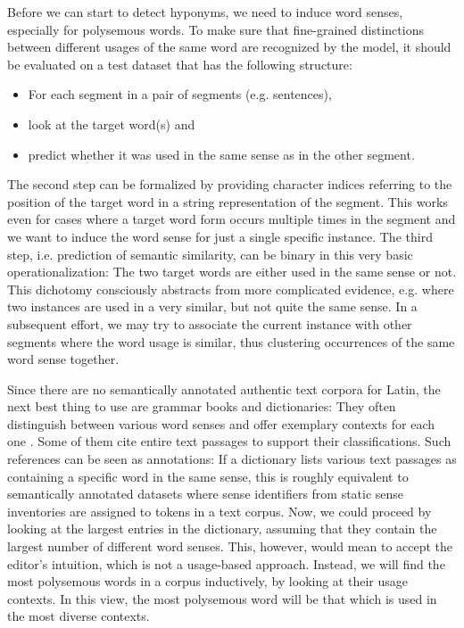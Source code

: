 \documentclass[runningheads]{llncs}
\begin{document}
Before we can start to detect hyponyms, we need to induce word senses, especially for polysemous words. To make sure that fine-grained distinctions between different usages of the same word are recognized by the model, it should be evaluated on a test dataset that has the following structure:
\begin{itemize}
	\item For each segment in a pair of segments (e.g. sentences),
	\item look at the target word(s) and
	\item predict whether it was used in the same sense as in the other segment.
\end{itemize}
The second step can be formalized by providing character indices referring to the position of the target word in a string representation of the segment. This works even for cases where a target word form occurs multiple times in the segment and we want to induce the word sense for just a single specific instance. The third step, i.e. prediction of semantic similarity, can be binary in this very basic operationalization: The two target words are either used in the same sense or not. This dichotomy consciously abstracts from more complicated evidence, e.g. where two instances are used in a very similar, but not quite the same sense. In a subsequent effort, we may try to associate the current instance with other segments where the word usage is similar, thus clustering occurrences of the same word sense together. 

Since there are no semantically annotated authentic text corpora for Latin, the next best thing to use are grammar books and dictionaries: They often distinguish between various word senses and offer exemplary contexts for each one \parencites{georgesAusfuhrlichesLateinischDeutschesHandworterbuch1913}{niederauNavigiumLateinDeutschWorterbuch2012}. Some of them cite entire text passages \parencites{shortLatinDictionary1879}{kuhnerAusfuhrlicheGrammatikLateinischen1914}{mengeLehrbuchLateinischenSyntax2009} to support their classifications. Such references can be seen as annotations: If a dictionary lists various text passages as containing a specific word in the same sense, this is roughly equivalent to semantically annotated datasets where sense identifiers from static sense inventories are assigned to tokens in a text corpus. Now, we could proceed by looking at the largest entries in the dictionary, assuming that they contain the largest number of different word senses. This, however, would mean to accept the editor's intuition, which is not a usage-based approach. Instead, we will find the most polysemous words in a corpus inductively, by looking at their usage contexts. In this view, the most polysemous word will be that which is used in the most diverse contexts.
\end{document}
